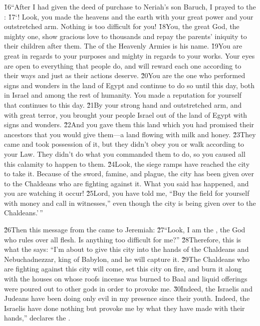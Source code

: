 \v{16}``After I had given the deed of purchase to Neriah's son Baruch, I prayed to the : \v{17}`! Look, you made the heavens and the earth with your great power and your outstretched arm. Nothing is too difficult for you! \v{18}You, the great God, the mighty one, show gracious love to thousands and repay the parents' iniquity to their children after them. The  of the Heavenly Armies is his name. \v{19}You are great in regards to your purposes and mighty in regards to your works. Your eyes are open to everything that people do, and will reward each one according to their ways and just as their actions deserve. \v{20}You are the one who performed signs and wonders in the land of Egypt and continue to do so until this day, both in Israel and among the rest of humanity. You made a reputation for yourself that continues to this day. \v{21}By your strong hand and outstretched arm, and with great terror, you brought your people Israel out of the land of Egypt with signs and wonders. \v{22}And you gave them this land which you had promised their ancestors that you would give them---a land flowing with milk and honey. \v{23}They came and took possession of it, but they didn't obey you or walk according to your Law. They didn't do what you commanded them to do, so you caused all this calamity to happen to them. \v{24}Look, the siege ramps have reached the city to take it. Because of the sword, famine, and plague, the city has been given over to the Chaldeans who are fighting against it. What you said has happened, and you are watching it occur! \v{25}Lord, you have told me, ``Buy the field for yourself with money and call in witnesses,'' even though the city is being given over to the Chaldeans.'\,''

\v{26}Then this message from the  came to Jeremiah: \v{27}``Look, I am the , the God who rules over all flesh. Is anything too difficult for me?'' \v{28}Therefore, this is what the  says: ``I'm about to give this city into the hands of the Chaldeans and Nebuchadnezzar, king of Babylon, and he will capture it. \v{29}The Chaldeans who are fighting against this city will come, set this city on fire, and burn it along with the houses on whose roofs incense was burned to Baal and liquid offerings were poured out to other gods in order to provoke me. \v{30}Indeed, the Israelis and Judeans have been doing only evil in my presence since their youth. Indeed, the Israelis have done nothing but provoke me by what they have made with their hands,'' declares the .

